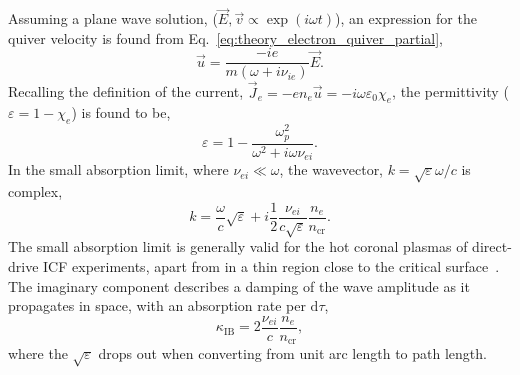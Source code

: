 Assuming a plane wave solution, ($\vec{E},\vec{v}\propto \exp{(i\omega t)}$), an expression for the quiver velocity is found from Eq.~\ref{eq:theory_electron_quiver_partial},
\begin{equation}
    \vec{u} = \frac{-ie}{m(\omega + i\nu_{ie})}\vec{E}.
\end{equation}
Recalling the definition of the current, $\vec{J}_e = -e n_e \vec{u} = -i\omega \varepsilon_0 \chi_e$, the permittivity ($\varepsilon = 1-\chi_e$) is found to be,
\begin{equation}
    \varepsilon = 1 - \frac{\omega_p^2}{\omega^2 + i \omega\nu_{ei}}.
\end{equation}
In the small absorption limit, where $\nu_{ei}\ll \omega$, the wavevector, $k = \sqrt{\varepsilon}\omega/c$ is complex,
\begin{equation}
    k = \frac{\omega}{c}\sqrt{\varepsilon} + i\frac{1}{2}\frac{\nu_{ei}}{c\sqrt{\varepsilon}}\frac{n_e}{n_{\text{cr}}}.
\end{equation}
The small absorption limit is generally valid for the hot coronal plasmas of direct-drive \ac{ICF} experiments, apart from in a thin region close to the critical surface~\cite{colaitis_real_2019}.
The imaginary component describes a damping of the wave amplitude as it propagates in space, with an absorption rate per $\text{d}\tau$,
\begin{equation}
    \label{eq:theory_inv_brem}
    \kappa_{\text{IB}} = 2 \frac{\nu_{ei}}{c}\frac{n_e}{n_{\text{cr}}},
\end{equation}
where the $\sqrt{\varepsilon}$ drops out when converting from unit arc length to path length.

